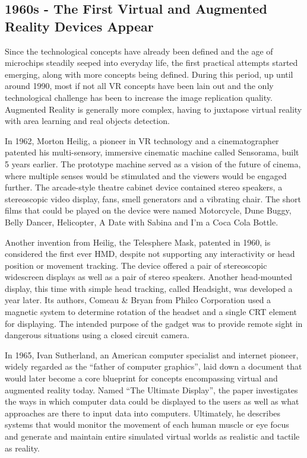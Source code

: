 \documentclass[12pt, a4paper]{article}
\begin{document}
\subsection{1960s - The First Virtual and Augmented Reality Devices Appear}

Since the technological concepts have already been defined and the age of microchips steadily seeped into everyday life, the first practical attempts started emerging, along with more concepts being defined. During this period, up until around 1990, most if not all VR concepts have been lain out and the only technological challenge has been to increase the image replication quality. Augmented Reality is generally more complex, having to juxtapose virtual reality with area learning and real objects detection.

In 1962, Morton Heilig, a pioneer in VR technology and a cinematographer patented his multi-sensory, immersive cinematic machine called Sensorama, built 5 years earlier. The prototype machine served as a vision of the future of cinema, where multiple senses would be stimulated and the viewers would be engaged further. The arcade-style theatre cabinet device contained stereo speakers, a stereoscopic video display, fans, smell generators and a vibrating chair. The short films that could be played on the device were named Motorcycle, Dune Buggy, Belly Dancer, Helicopter, A Date with Sabina and I’m a Coca Cola Bottle.

Another invention from Heilig, the Telesphere Mask, patented in 1960, is considered the first ever HMD, despite not supporting any interactivity or head position or movement tracking. The device offered a pair of stereoscopic widescreen displays as well as a pair of stereo speakers. Another head-mounted display, this time with simple head tracking, called Headsight, was developed a year later. Its authors, Comeau \& Bryan from Philco Corporation used a magnetic system to determine rotation of the headset and a single CRT element for displaying. The intended purpose of the gadget was to provide remote sight in dangerous situations using a closed circuit camera.

In 1965, Ivan Sutherland, an American computer specialist and internet pioneer, widely regarded as the “father of computer graphics”, laid down a document that would later become a core blueprint for concepts encompassing virtual and augmented reality today. Named “The Ultimate Display”, the paper investigates the ways in which computer data could be displayed to the users as well as what approaches are there to input data into computers. Ultimately, he describes systems that would monitor the movement of each human muscle or eye focus and generate and maintain entire simulated virtual worlds as realistic and tactile as reality.
\end{document}
